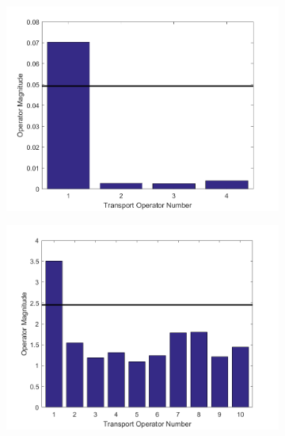 \documentclass[letterpaper]{article} %
\begin{document}
\begin{figure}[h]

\centering
\begin{subfigure}[b]{0.49\columnwidth}
\centering
{\includegraphics[width=0.99\columnwidth]{circleTransOptMag_new.png}}
\caption{}
\label{fig:circleTOMag}
\end{subfigure}
\begin{subfigure}[b]{0.49\columnwidth}
\centering
{\includegraphics[width=0.99\columnwidth]{rotDigitTransOptMag.png}}
\caption{}
\label{fig:rotTOMag}
\end{subfigure}
\begin{subfigure}[b]{0.49\columnwidth}
\centering

\end{subfigure}
\end{figure}
\end{document}
